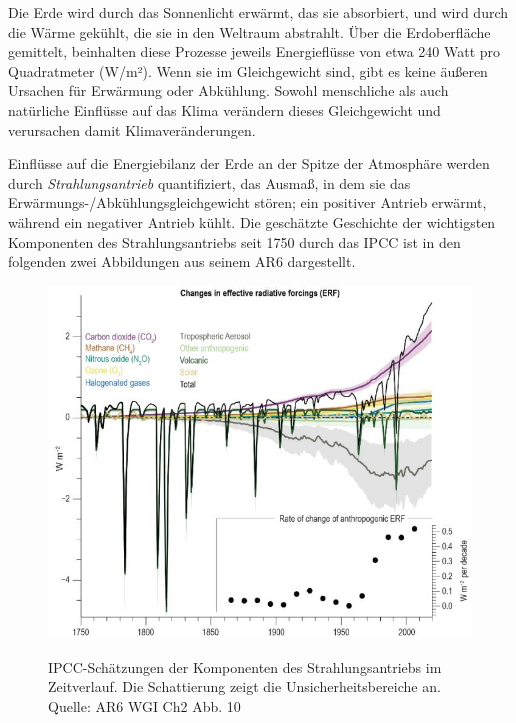 \documentclass[12pt,paper=a4,DIV=12,parskip=never,chapterprefix=false,headings=standardclasses]{scrreprt}
\begin{document}
Die Erde wird durch das Sonnenlicht erwärmt, das sie absorbiert, und wird durch die Wärme gekühlt, die sie in den Weltraum abstrahlt. Über die Erdoberfläche gemittelt, beinhalten diese Prozesse jeweils Energieflüsse von etwa 240 Watt pro Quadratmeter (W/m²). Wenn sie im Gleichgewicht sind, gibt es keine äußeren Ursachen für Erwärmung oder Abkühlung. Sowohl menschliche als auch natürliche Einflüsse auf das Klima verändern dieses Gleichgewicht und verursachen damit Klimaveränderungen.

Einflüsse auf die Energiebilanz der Erde an der Spitze der Atmosphäre werden durch \emph{Strahlungsantrieb} quantifiziert, das Ausmaß, in dem sie das Erwärmungs-/Abkühlungsgleichgewicht stören; ein positiver Antrieb erwärmt, während ein negativer Antrieb kühlt. Die geschätzte Geschichte der wichtigsten Komponenten des Strahlungsantriebs seit 1750 durch das IPCC ist in den folgenden zwei Abbildungen aus seinem AR6 dargestellt.

\begin{figure}[H]
\begin{center}
\includegraphics[width=1.0\textwidth]{bilder/bilderKlima-0006.jpg}\\[1cm]
\end{center}
\caption{IPCC-Schätzungen der Komponenten des Strahlungsantriebs im Zeitverlauf. Die Schattierung zeigt
die Unsicherheitsbereiche an. Quelle: AR6 WGI Ch2 Abb. 10}
\end{figure}
\end{document}
